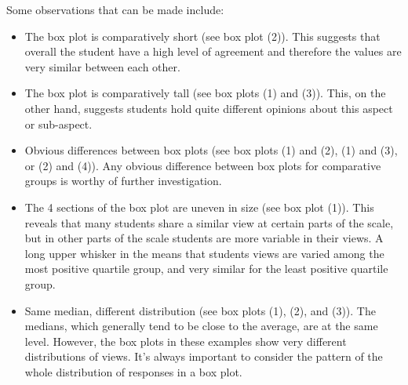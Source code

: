 Some observations that can be made include:
\begin{itemize}
    \item The box plot is comparatively short (see box plot  (2)). This suggests that overall the student have a high level of agreement and therefore the values are very similar between each other.
    \item The box plot is comparatively tall (see box plots (1) and (3)). This, on the other hand, suggests students hold quite different opinions about this aspect or sub-aspect.
    \item Obvious differences between box plots (see box plots (1) and (2), (1) and (3), or (2) and (4)). Any obvious difference between box plots for comparative groups is worthy of further investigation.
    \item The 4 sections of the box plot are uneven in size (see box plot (1)). This reveals that many students share a similar view at certain parts of the scale, but in other parts of the scale students are more variable in their views. A long upper whisker in the means that students views are varied among the most positive quartile group, and very similar for the least positive quartile group. 
    \item Same median, different distribution (see box plots (1), (2), and (3)). The medians, which generally tend to be close to the average, are at the same level. However, the box plots in these examples show very different distributions of views. It's always important to consider the pattern of the whole distribution of responses in a box plot.
\end{itemize}



